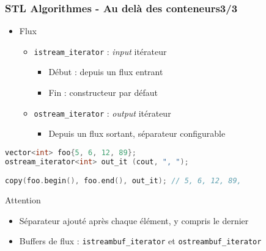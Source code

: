 \documentclass[C++.tex]{subfiles}
\begin{document}
\begin{frame}[fragile]
	\frametitle{STL Algorithmes - Au delà des conteneurs\titlehfill{}3/3}
	\begin{itemize}
		\item Flux
		\begin{itemize}
			\item \lstinline|istream_iterator| : \textit{input} itérateur
			\begin{itemize}
				\item Début : depuis un flux entrant
				\item Fin : constructeur par défaut
			\end{itemize}
			\item \lstinline|ostream_iterator| : \textit{output} itérateur
			\begin{itemize}
				\item Depuis un flux sortant, séparateur configurable
			\end{itemize}
		\end{itemize}
	\end{itemize}

	\begin{lstlisting}[language=C++]
vector<int> foo{5, 6, 12, 89};
ostream_iterator<int> out_it (cout, ", ");

copy(foo.begin(), foo.end(), out_it); // 5, 6, 12, 89,\end{lstlisting}

	\begin{alertblock}{Attention}
		\begin{itemize}
			\item Séparateur ajouté après chaque élément, y compris le dernier
		\end{itemize}
	\end{alertblock}

	\begin{itemize}
		\item Buffers de flux : \lstinline|istreambuf_iterator| et \lstinline|ostreambuf_iterator|
	\end{itemize}
\end{frame}
\end{document}
